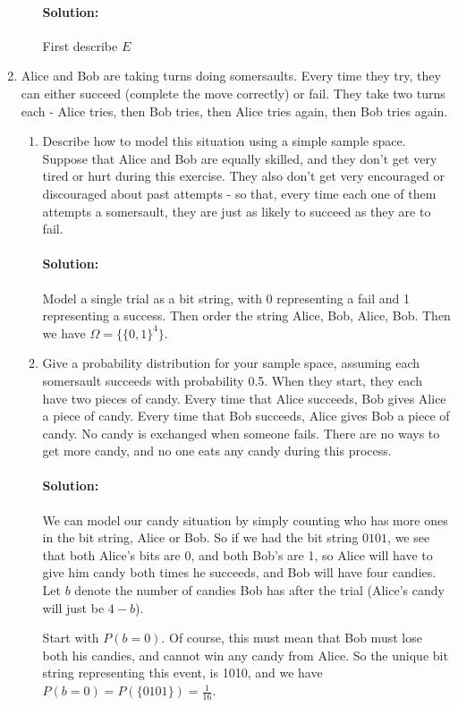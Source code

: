 \documentclass{article}
\begin{document}
\begin{enumerate}
\begin{enumerate}
                \paragraph{Solution: }First describe $E$
        \end{enumerate}
\item Alice and Bob are taking turns doing somersaults. Every time they try, they can either succeed (complete the move correctly) or fail. They take two turns each - Alice tries, then Bob tries, then Alice tries again, then Bob tries again.
\begin{enumerate}
    \item Describe how to model this situation using a simple sample space. Suppose that Alice and Bob are equally skilled, and they don't get very tired or hurt during this exercise. They also don't get very encouraged or discouraged about past attempts - so that, every time each one of them attempts a somersault, they are just as likely to succeed as they are to fail.
        \paragraph{Solution: }Model a single trial as a bit string, with 0 representing a fail and 1 representing a success. Then order the string Alice, Bob, Alice, Bob. Then we have $\Omega=\{\{ 0,1\}^{4}\} $.
    \item Give a probability distribution for your sample space, assuming each somersault succeeds with probability 0.5. When they start, they each have two pieces of candy. Every time that Alice succeeds, Bob gives Alice a piece of candy. Every time that Bob succeeds, Alice gives Bob a piece of candy. No candy is exchanged when someone fails. There are no ways to get more candy, and no one eats any candy during this process.
        \paragraph{Solution: }We can model our candy situation by simply counting who has more ones in the bit string, Alice or Bob. So if we had the bit string $0101$, we see that both Alice's bits are 0, and both Bob's are 1, so Alice will have to give him candy both times he succeeds, and Bob will have four candies. Let $b$ denote the number of candies Bob has after the trial (Alice's candy will just be $4-b$).

        Start with $P(b=0)$. Of course, this must mean that Bob must lose both his candies, and cannot win any candy from Alice. So the unique bit string representing this event, is 1010, and we have $P(b=0)=P(\{0101\} )=\frac{1}{16}$.


\end{enumerate}
\end{enumerate}
\end{document}
